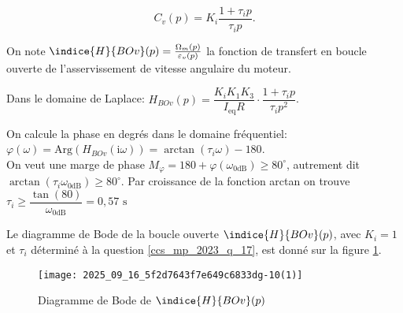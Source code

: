 $$
C_{v}(p)=K_{i} \frac{1+\tau_{i} p}{\tau_{i} p} .
$$

On note $\indice{H}{BOv}(p)=\frac{\Omega_{m}(p)}{\varepsilon_{v}(p)}$ la fonction de transfert en boucle ouverte de l'asservissement de vitesse angulaire du moteur.
\fi

\ifprof
\begin{corrige}
Dans le domaine de Laplace: $H_{BOv}(p) = \dfrac{K_i K_1 K_3}{I_{\text{eq}}R} \cdot \dfrac{1 + \tau_i p}{\tau_i p^2}$.

On calcule la phase en degrés dans le domaine fréquentiel: $\varphi(\omega) = \text{Arg}\left( H_{BOv}(\text{i}\omega) \right) = \arctan(\tau_i \omega) - 180$.\\

On veut une marge de phase $M_{\varphi} = 180 + \varphi(\omega_{0\text{dB}}) \geq 80^\circ$, autrement dit $\arctan(\tau_i \omega_{0\text{dB}}) \geq 80^\circ$. Par croissance de la fonction arctan on trouve $\boxed{\tau_i \geq \dfrac{\tan(80)}{\omega_{0\text{dB}}} = 0,57\text{ s}}$
\end{corrige}
\else
\fi

\ifprof
\else

Le diagramme de Bode de la boucle ouverte $\indice{H}{B O v}(p)$, avec $K_{i}=1$ et $\tau_{i}$ déterminé à la question \ref{ccs_mp_2023_q_17}, est donné sur la figure \ref{ccs_mp_2023_fig_13}.



\begin{figure}[!h]
\centering
\texttt{[image: 2025\_09\_16\_5f2d7643f7e649c6833dg-10(1)]}
\caption{\label{ccs_mp_2023_fig_13}   Diagramme de Bode de $\indice{H}{BOv}(p)$}
\end{figure}
\fi



